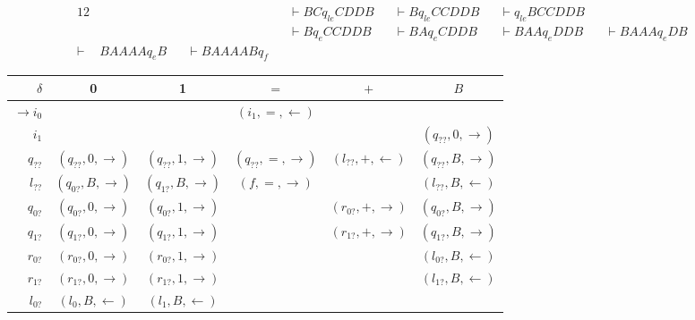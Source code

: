 \documentclass[docid=TP11]{tcom_TP}
\begin{document}
{\begin{alignat*}{12}
		   &             &&                   &&\vdash BC q_{le} CDDB &&\vdash B q_{le} CCDDB &&\vdash q_{le} BCCDDB  &&\\
		   &             &&                   &&\vdash B q_e CCDDB    &&\vdash BA q_e CDDB    &&\vdash BAA q_e DDB    &&\vdash BAAA q_e DB    &&\\
	\vdash & BAAAA q_e B &&\vdash BAAAAB q_f 
\end{alignat*}
\begin{center}
	\begin{tabular}{r | c c c c c}
		$\delta$             & 0                        & 1                        & $=$                      & $+$                      & $B$                      \\ \hline
		$\rightarrow i_0   $ &                          &                          & $(i_1   ,=,\leftarrow )$ &                          &                          \\
		$            i_1   $ &                          &                          &                          &                          & $(q_{??},0,\rightarrow)$ \\
		$            q_{??}$ & $(q_{??},0,\rightarrow)$ & $(q_{??},1,\rightarrow)$ & $(q_{??},=,\rightarrow)$ & $(l_{??},+,\leftarrow )$ & $(q_{??},B,\rightarrow)$ \\
		$            l_{??}$ & $(q_{0?},B,\rightarrow)$ & $(q_{1?},B,\rightarrow)$ & $(f     ,=,\rightarrow)$ &                          & $(l_{??},B,\leftarrow )$ \\
		$            q_{0?}$ & $(q_{0?},0,\rightarrow)$ & $(q_{0?},1,\rightarrow)$ &                          & $(r_{0?},+,\rightarrow)$ & $(q_{0?},B,\rightarrow)$ \\
		$            q_{1?}$ & $(q_{1?},0,\rightarrow)$ & $(q_{1?},1,\rightarrow)$ &                          & $(r_{1?},+,\rightarrow)$ & $(q_{1?},B,\rightarrow)$ \\
		$            r_{0?}$ & $(r_{0?},0,\rightarrow)$ & $(r_{0?},1,\rightarrow)$ &                          &                          & $(l_{0?},B,\leftarrow )$ \\
		$            r_{1?}$ & $(r_{1?},0,\rightarrow)$ & $(r_{1?},1,\rightarrow)$ &                          &                          & $(l_{1?},B,\leftarrow )$ \\
		$            l_{0?}$ & $(l_{0 },B,\leftarrow )$ & $(l_{1 },B,\leftarrow )$ &                          &                          &                          \\

\end{tabular}
\end{center}}
\end{document}
